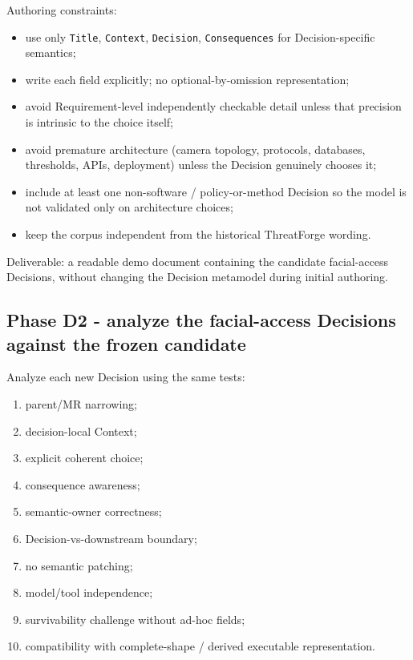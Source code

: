 \documentclass[
  10pt,
]{article}
\providecommand{\tightlist}{%
  \setlength{\itemsep}{0pt}\setlength{\parskip}{0pt}}
\begin{document}
Authoring constraints:

\begin{itemize}
\tightlist
\item
  use only \texttt{Title}, \texttt{Context}, \texttt{Decision},
  \texttt{Consequences} for Decision-specific semantics;
\item
  write each field explicitly; no optional-by-omission representation;
\item
  avoid Requirement-level independently checkable detail unless that
  precision is intrinsic to the choice itself;
\item
  avoid premature architecture (camera topology, protocols, databases,
  thresholds, APIs, deployment) unless the Decision genuinely chooses
  it;
\item
  include at least one non-software / policy-or-method Decision so the
  model is not validated only on architecture choices;
\item
  keep the corpus independent from the historical ThreatForge wording.
\end{itemize}

Deliverable: a readable demo document containing the candidate
facial-access Decisions, without changing the Decision metamodel during
initial authoring.

\subsection{Phase D2 - analyze the facial-access Decisions against the
frozen
candidate}\label{phase-d2---analyze-the-facial-access-decisions-against-the-frozen-candidate}

Analyze each new Decision using the same tests:

\begin{enumerate}
\def\labelenumi{\arabic{enumi}.}
\tightlist
\item
  parent/MR narrowing;
\item
  decision-local Context;
\item
  explicit coherent choice;
\item
  consequence awareness;
\item
  semantic-owner correctness;
\item
  Decision-vs-downstream boundary;
\item
  no semantic patching;
\item
  model/tool independence;
\item
  survivability challenge without ad-hoc fields;
\item
  compatibility with complete-shape / derived executable representation.
\end{enumerate}
\end{document}

